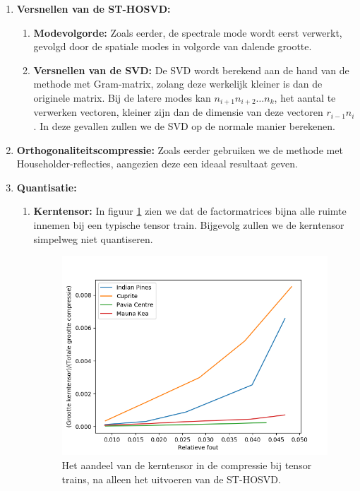 \newpage
\begin{enumerate}
\item \textbf{Versnellen van de ST-HOSVD:}
\begin{enumerate}
\item \textbf{Modevolgorde:} Zoals eerder, de spectrale mode wordt eerst verwerkt, gevolgd door de spatiale modes in volgorde van dalende grootte.
\item \textbf{Versnellen van de SVD:} De SVD wordt berekend aan de hand van de methode met Gram-matrix, zolang deze werkelijk kleiner is dan de originele matrix. Bij de latere modes kan $n_{i+1} n_{i+2} \dots n_k$, het aantal te verwerken vectoren, kleiner zijn dan de dimensie van deze vectoren $r_{i-1} n_i$. In deze gevallen zullen we de SVD op de normale manier berekenen.
\end{enumerate}
\item \textbf{Orthogonaliteitscompressie:} Zoals eerder gebruiken we de methode met Householder-reflecties, aangezien deze een ideaal resultaat geven.

\newpage
\item \textbf{Quantisatie:}
\begin{enumerate}

\item \textbf{Kerntensor:} In figuur \ref{fig:tensor-trains-core-tensor-size} zien we dat de factormatrices bijna alle ruimte innemen bij een typische tensor train. Bijgevolg zullen we de kerntensor simpelweg niet quantiseren.

\begin{figure}[]
  \centering
  \includegraphics[scale=0.7]{images/tensor_trains_core_tensor_size.png}
  \caption{Het aandeel van de kerntensor in de compressie bij tensor trains, na alleen het uitvoeren van de ST-HOSVD.}
\label{fig:tensor-trains-core-tensor-size}
\end{figure}


\end{enumerate}
\end{enumerate}
